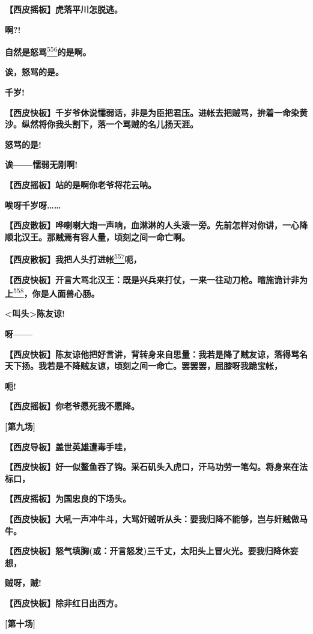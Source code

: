 \textbf{【西皮摇板】虎落平川怎脱逃。}

\textbf{啊?!}

\textbf{自然是怒骂}\protect\hyperlink{fn556}{\textsuperscript{556}}\textbf{的是啊。}

\textbf{诶，怒骂的是。}

\textbf{千岁!}

\textbf{【西皮快板】千岁爷休说懦弱话，非是为臣把君压。进帐去把贼骂，拚着一命染黄沙。纵然将你我头割下，落一个骂贼的名儿扬天涯。}

\textbf{怒骂的是!}

\textbf{诶------懦弱无刚啊!}

\textbf{【西皮摇板】站的是啊你老爷将花云呐。}

\textbf{唉呀千岁呀\ldots{}\ldots{}}

\textbf{【西皮散板】哗喇喇大炮一声响，血淋淋的人头滚一旁。先前怎样对你讲，一心降顺北汉王。那贼焉有容人量，顷刻之间一命亡啊。}

\textbf{【西皮散板】我把人头打进帐}\protect\hyperlink{fn557}{\textsuperscript{557}}\textbf{呃，}

\textbf{【西皮快板】开言大骂北汉王：既是兴兵来打仗，一来一往动刀枪。暗施诡计非为上}\protect\hyperlink{fn558}{\textsuperscript{558}}\textbf{，你是人面兽心肠。}

\textbf{\textless{}叫头\textgreater{}陈友谅!}

\textbf{呀------}

\textbf{【西皮快板】陈友谅他把好言讲，背转身来自思量：我若是降了贼友谅，落得骂名天下扬。我若是不降贼友谅，顷刻之间一命亡。罢罢罢，屈膝呀我跪宝帐，}

\textbf{呃!}

\textbf{【西皮摇板】你老爷愿死我不愿降。}

\textbf{{[}第九场{]}}

\textbf{【西皮导板】盖世英雄遭毒手哇，}

\textbf{【西皮快板】好一似鳌鱼吞了钩。采石矶头入虎口，汗马功劳一笔勾。将身来在法标口，}

\textbf{【西皮摇板】为国忠良的下场头。}

\textbf{【西皮快板】大吼一声冲牛斗，大骂奸贼听从头：要我归降不能够，岂与奸贼做马牛。}

\textbf{【西皮快板】怒气填胸(或：开言怒发)三千丈，太阳头上冒火光。要我归降休妄想，}

\textbf{贼呀，贼!}

\textbf{【西皮快板】除非红日出西方。}

\textbf{{[}第十场{]}}

